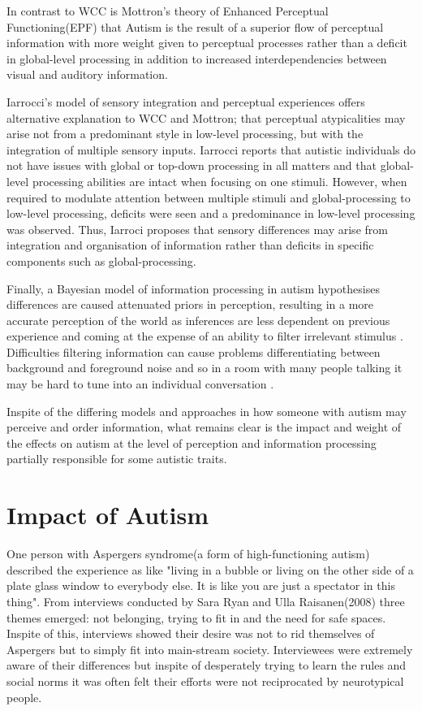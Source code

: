 \documentclass[11pt]{report}
\begin{document}
In contrast to WCC is Mottron's theory of Enhanced Perceptual Functioning(EPF) that Autism is the result of a superior flow of perceptual information with more weight given to perceptual processes rather than a deficit in global-level processing 
in addition to increased interdependencies between visual and auditory information. 

Iarrocci’s model of sensory integration and perceptual experiences offers alternative explanation to WCC and Mottron; that perceptual atypicalities may arise not from a predominant style in low-level processing, but with the integration of multiple sensory inputs. Iarrocci reports that autistic individuals do not have issues with global or top-down processing in all matters and that global-level processing abilities are intact when focusing on one stimuli. However, when required to modulate attention between multiple stimuli and global-processing to low-level processing, deficits were seen and a predominance in low-level processing was observed. Thus, Iarroci proposes that sensory differences may arise from integration and organisation of information rather than deficits in specific components such as global-processing.

Finally, a Bayesian model of information processing in autism hypothesises differences are caused attenuated priors in perception, resulting in a more accurate perception of the world as inferences are less dependent on previous experience and coming at the expense of an ability to filter irrelevant stimulus \cite{bayes}. Difficulties filtering information can cause problems differentiating between background and foreground noise and so in a room with many people talking it may be hard to tune into an individual conversation \cite{bayes}. 

Inspite of the differing models and approaches in how someone with autism may perceive and order information, what remains clear is the impact and weight of the effects on autism at the level of perception and information processing partially responsible for some autistic traits. 

\section{Impact of Autism}
One person with Aspergers syndrome(a form of high-functioning autism) described the experience as like "living in a bubble or living on the other side of a plate glass window to everybody else. It is like you are just a spectator in this thing"\cite{aspieway}. From interviews conducted by Sara Ryan and Ulla Raisanen(2008) three themes emerged: not belonging, trying to fit in and the need for safe spaces. Inspite of this, interviews showed their desire was not to rid themselves of Aspergers but to simply fit into main-stream society. Interviewees were extremely aware of their differences but inspite of desperately trying to learn the rules and social norms it was often felt their efforts were not reciprocated by neurotypical people.
\end{document}
